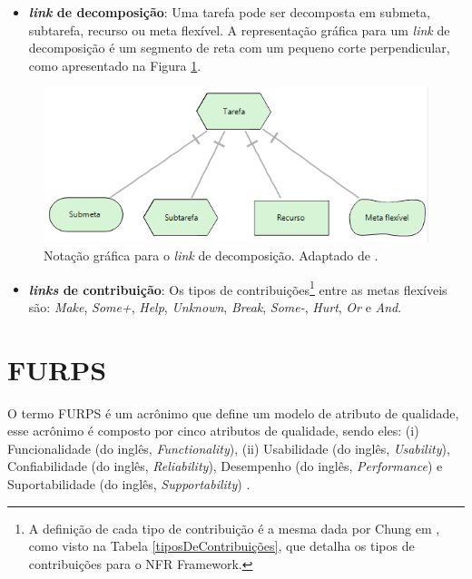 \begin{itemize}	
	\item \textbf{\textit{link} de decomposição}: Uma tarefa pode ser decomposta em submeta, subtarefa, recurso ou meta flexível. A representação gráfica para um \textit{link} de decomposição é um segmento de reta com um pequeno corte perpendicular, como apresentado na Figura \ref{decomposicaoLink}.    
\end{itemize}	

\begin{figure}[h!]
		\centering
		\includegraphics[keepaspectratio=true,scale=1.0]{figuras/decomposicaoLink.PNG}
		\caption{Notação gráfica para o \textit{link} de decomposição. Adaptado de \cite{istarwiki20}.}
		\label{decomposicaoLink}
\end{figure}

\begin{itemize}		
	\item \textbf{\textit{links} de contribuição}: Os tipos de contribuições\footnote[1]{A definição de cada tipo de contribuição é a mesma dada por Chung em \cite{chung2012non}, como visto na Tabela \ref{tiposDeContribuições}, que detalha os tipos de contribuições para o NFR Framework.} entre as metas flexíveis são: \textit{Make}, \textit{Some+}, \textit{Help}, \textit{Unknown}, \textit{Break}, \textit{Some-}, \textit{Hurt}, \textit{Or} e \textit{And}. 
\end{itemize}


\section{FURPS}
\label{sec:furps}

O termo FURPS é um acrônimo que define um modelo de atributo de qualidade, esse acrônimo é composto por cinco atributos de qualidade, sendo eles: (i) Funcionalidade (do inglês, \textit{Functionality}), (ii) Usabilidade (do inglês, \textit{Usability}), Confiabilidade (do inglês, \textit{Reliability}), Desempenho (do inglês, \textit{Performance}) e Suportabilidade (do inglês, \textit{Supportability}) \cite{umar2011analyzing}.


